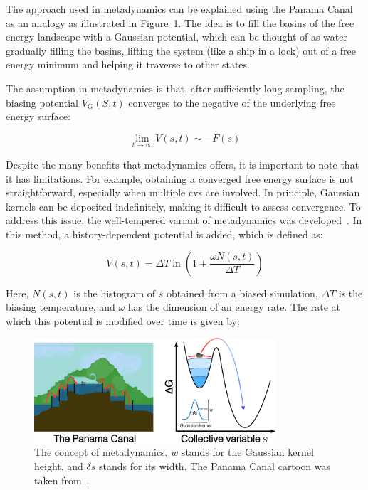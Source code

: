 The approach used in metadynamics can be explained using the Panama Canal as an analogy as illustrated in Figure~\ref{fig:metadynamics}. The idea is to fill the basins of the free energy landscape with a Gaussian potential, which can be thought of as water gradually filling the basins, lifting the system (like a ship in a lock) out of a free energy minimum and helping it traverse to other states.

The assumption in metadynamics is that, after sufficiently long sampling, the biasing potential $V_{\text{G}}(S, t)$ converges to the negative of the underlying free energy surface:

\begin{equation}
    \label{eq:free_energy_from_metadynamics}
    \lim_{t \to \infty} V(s,t) \sim -F(s)
\end{equation}

Despite the many benefits that metadynamics offers, it is important to note that it has limitations. For example, obtaining a converged free energy surface is not straightforward, especially when multiple \acp{cv} are involved. In principle, Gaussian kernels can be deposited indefinitely, making it difficult to assess convergence. To address this issue, the well-tempered variant of metadynamics was developed~\citep{barducciWellTemperedMetadynamicsSmoothly2008}. In this method, a history-dependent potential is added, which is defined as:

\begin{equation}
    V(s, t) = \Delta T \ln\left(1 + \frac{\omega N(s, t)}{\Delta T}\right)
    \label{eq:history_dependant_potential}
\end{equation}

Here, $N(s, t)$ is the histogram of $s$ obtained from a biased simulation, $\Delta T$ is the biasing temperature, and $\omega$ has the dimension of an energy rate. The rate at which this potential is modified over time is given by:

\begin{figure}[t!]
    \centering
    \includegraphics[width=0.8\textwidth]{Figures/2_Theory/theory_metadynamics.png}
    \caption{The concept of metadynamics. $w$ stands for the Gaussian kernel height, and $\delta s$ stands for its width. The Panama Canal cartoon was taken from~\citep{HowPanamaCanal}.}
    \label{fig:metadynamics}
\end{figure}

